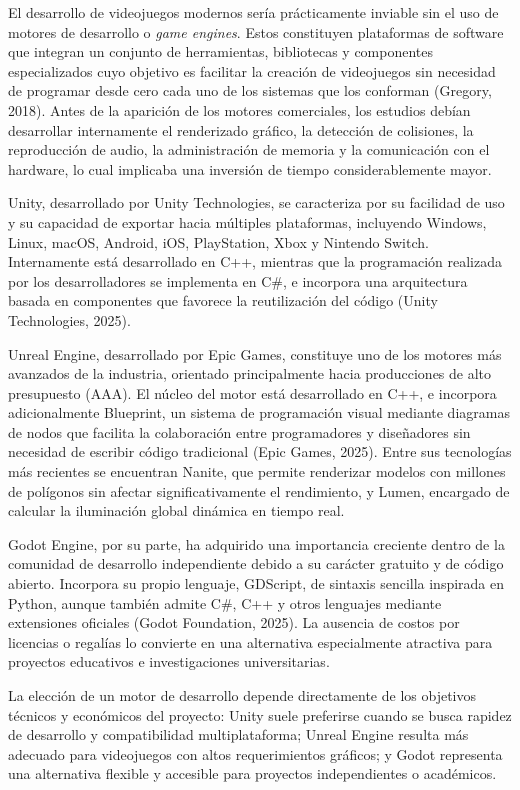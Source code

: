 \documentclass[12pt]{report}
\begin{document}
El desarrollo de videojuegos modernos sería prácticamente inviable sin el uso de motores de desarrollo o \textit{game engines}. Estos constituyen plataformas de software que integran un conjunto de herramientas, bibliotecas y componentes especializados cuyo objetivo es facilitar la creación de videojuegos sin necesidad de programar desde cero cada uno de los sistemas que los conforman (Gregory, 2018). Antes de la aparición de los motores comerciales, los estudios debían desarrollar internamente el renderizado gráfico, la detección de colisiones, la reproducción de audio, la administración de memoria y la comunicación con el hardware, lo cual implicaba una inversión de tiempo considerablemente mayor.

Unity, desarrollado por Unity Technologies, se caracteriza por su facilidad de uso y su capacidad de exportar hacia múltiples plataformas, incluyendo Windows, Linux, macOS, Android, iOS, PlayStation, Xbox y Nintendo Switch. Internamente está desarrollado en C++, mientras que la programación realizada por los desarrolladores se implementa en C\#, e incorpora una arquitectura basada en componentes que favorece la reutilización del código (Unity Technologies, 2025).

Unreal Engine, desarrollado por Epic Games, constituye uno de los motores más avanzados de la industria, orientado principalmente hacia producciones de alto presupuesto (AAA). El núcleo del motor está desarrollado en C++, e incorpora adicionalmente Blueprint, un sistema de programación visual mediante diagramas de nodos que facilita la colaboración entre programadores y diseñadores sin necesidad de escribir código tradicional (Epic Games, 2025). Entre sus tecnologías más recientes se encuentran Nanite, que permite renderizar modelos con millones de polígonos sin afectar significativamente el rendimiento, y Lumen, encargado de calcular la iluminación global dinámica en tiempo real.

Godot Engine, por su parte, ha adquirido una importancia creciente dentro de la comunidad de desarrollo independiente debido a su carácter gratuito y de código abierto. Incorpora su propio lenguaje, GDScript, de sintaxis sencilla inspirada en Python, aunque también admite C\#, C++ y otros lenguajes mediante extensiones oficiales (Godot Foundation, 2025). La ausencia de costos por licencias o regalías lo convierte en una alternativa especialmente atractiva para proyectos educativos e investigaciones universitarias.

La elección de un motor de desarrollo depende directamente de los objetivos técnicos y económicos del proyecto: Unity suele preferirse cuando se busca rapidez de desarrollo y compatibilidad multiplataforma; Unreal Engine resulta más adecuado para videojuegos con altos requerimientos gráficos; y Godot representa una alternativa flexible y accesible para proyectos independientes o académicos.
\end{document}
